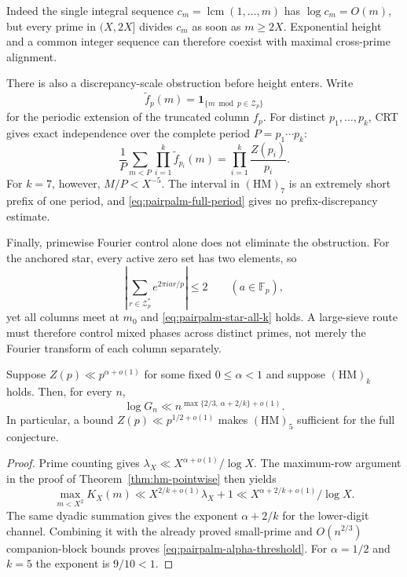 Indeed the single integral sequence
$c_m=\operatorname{lcm}(1,\ldots,m)$ has $\log c_m=O(m)$, but every
prime in $(X,2X]$ divides $c_m$ as soon as $m\geq2X$.  Exponential height
and a common integer sequence can therefore coexist with maximal
cross-prime alignment.

There is also a discrepancy-scale obstruction before height enters.  Write
\[
 \widetilde f_p(m)=
 \mathbf1_{\{m\bmod p\in\mathcal Z_p\}}
\]
for the periodic extension of the truncated column $f_p$.
For distinct $p_1,\ldots,p_k$, CRT gives exact independence over the
complete period $P=p_1\cdots p_k$:
\begin{equation}\label{eq:pairpalm-full-period}
 \frac1P\sum_{m<P}\prod_{i=1}^k\widetilde f_{p_i}(m)
 =\prod_{i=1}^k\frac{Z(p_i)}{p_i}.
\end{equation}
For $k=7$, however, $M/P<X^{-5}$.  The interval in
$(\mathrm{HM})_7$ is an extremely short prefix of one period, and
\eqref{eq:pairpalm-full-period} gives no prefix-discrepancy estimate.

Finally, primewise Fourier control alone does not eliminate the obstruction.
For the anchored star, every active zero set has two elements, so
\[
 \left|\sum_{r\in\mathcal Z_p^*}e^{2\pi iar/p}\right|\leq2
 \qquad(a\in\mathbb F_p),
\]
yet all columns meet at $m_0$ and
\eqref{eq:pairpalm-star-all-k} holds.  A large-sieve route must therefore
control mixed phases across distinct primes, not merely the Fourier
transform of each column separately.

\begin{corollary}
\label{cor:pairpalm-alpha-threshold}
Suppose $Z(p)\ll p^{\alpha+o(1)}$ for some fixed
$0\leq\alpha<1$ and suppose
$(\mathrm{HM})_k$ holds.  Then, for every $n$,
\begin{equation}\label{eq:pairpalm-alpha-threshold}
 \log G_n\ll n^{\max\{2/3,\,\alpha+2/k\}+o(1)}.
\end{equation}
In particular, a bound $Z(p)\ll p^{1/2+o(1)}$ makes
$(\mathrm{HM})_5$ sufficient for the full conjecture.
\end{corollary}

\begin{proof}
Prime counting gives
$\lambda_X\ll X^{\alpha+o(1)}/\log X$.
The maximum-row argument in the proof of
Theorem~\ref{thm:hm-pointwise} then yields
\[
 \max_{m<X^2}K_X(m)
 \ll X^{2/k+o(1)}\lambda_X+1
 \ll X^{\alpha+2/k+o(1)}/\log X.
\]
The same dyadic summation gives the exponent $\alpha+2/k$ for the
lower-digit channel.  Combining it with the already proved small-prime and
$O(n^{2/3})$ companion-block bounds proves
\eqref{eq:pairpalm-alpha-threshold}.
For $\alpha=1/2$ and $k=5$ the exponent is $9/10<1$.
\end{proof}

